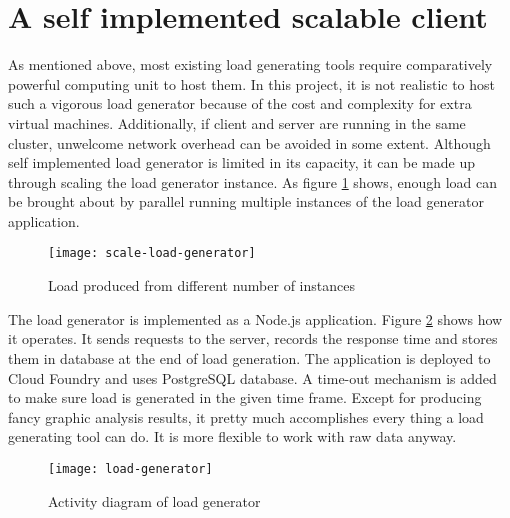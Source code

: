 \section{A self implemented scalable client}
	\label{scale-load-generator}
As mentioned above, most existing load generating tools require comparatively powerful computing unit to host them. In this project, it is not realistic to host such a vigorous load generator because of the cost and complexity for extra virtual machines. Additionally, if client and server are running in the same cluster, unwelcome network overhead can be avoided in some extent. Although self implemented load generator is limited in its capacity, it can be made up through scaling the load generator instance. As figure  \ref{scale-load-generator} shows, enough load can be brought about by parallel running multiple instances of the load generator application.
\begin{figure}[h]
	\centering
	\texttt{[image: scale-load-generator]}
	\caption{Load produced from different number of instances}
	\label{scale-load-generator}
\end{figure}


The load generator is implemented as a Node.js application. Figure \ref{load-generator} shows how it operates. It sends requests to the server, records the response time and stores them in database at the end of load generation. The application is deployed to Cloud Foundry and uses PostgreSQL database. A time-out mechanism is added to make sure load is generated in the given time frame. Except for producing fancy graphic analysis results, it pretty much accomplishes every thing a load generating tool can do. It is more flexible to work with raw data anyway.

 \begin{figure}[h]
	\centering
	\texttt{[image: load-generator]}
	\caption{Activity diagram of load generator}
	\label{load-generator}
\end{figure}

